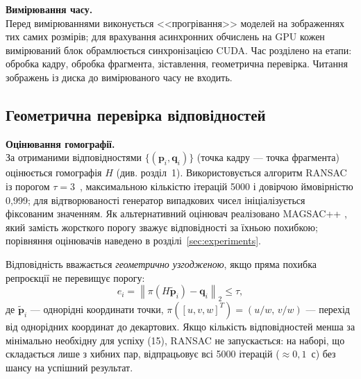 \textbf{Вимірювання часу.}\\
Перед вимірюваннями виконується <<прогрівання>> моделей на зображеннях тих самих розмірів; для врахування асинхронних обчислень на GPU кожен вимірюваний блок обрамлюється синхронізацією CUDA. Час розділено на етапи: обробка кадру, обробка фрагмента, зіставлення, геометрична перевірка. Читання зображень із диска до вимірюваного часу не входить.

\subsection{Геометрична перевірка відповідностей}

\textbf{Оцінювання гомографії.}\\
За отриманими відповідностями $\{(\mathbf{p}_i, \mathbf{q}_i)\}$ (точка кадру --- точка фрагмента) оцінюється гомографія $H$ (див. розділ~1). Використовується алгоритм RANSAC \cite{ransac} із порогом $\tau = 3$~\px{}, максимальною кількістю ітерацій 5000 і довірчою ймовірністю 0,999; для відтворюваності генератор випадкових чисел ініціалізується фіксованим значенням. Як альтернативний оцінювач реалізовано MAGSAC++ \cite{magsac}, який замість жорсткого порогу зважує відповідності за їхньою похибкою; порівняння оцінювачів наведено в розділі~\ref{sec:experiments}.

Відповідність вважається \emph{геометрично узгодженою}, якщо пряма похибка репроєкції не перевищує порогу:
\begin{equation}
e_i = \left\| \pi(H \tilde{\mathbf{p}}_i) - \mathbf{q}_i \right\|_2 \le \tau,
\end{equation}
де $\tilde{\mathbf{p}}_i$ --- однорідні координати точки, $\pi([u, v, w]^T) = (u/w,\, v/w)$ --- перехід від однорідних координат до декартових. Якщо кількість відповідностей менша за мінімально необхідну для успіху (15), RANSAC не запускається: на наборі, що складається лише з хибних пар,  відпрацьовує всі 5000 ітерацій ($\approx 0{,}1$~с) без шансу на успішний результат.

